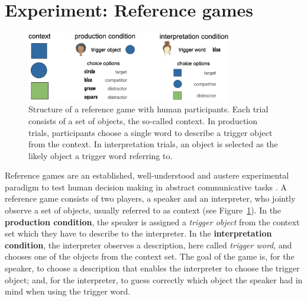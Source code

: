 \documentclass[fleqn]{article}
\begin{document}
\section{Experiment: Reference games}
\label{experiment-reference-games}

\begin{figure}
  \centering

  \includegraphics[width = 0.8\textwidth]{00-pics/reference-game.png}

  \caption{Structure of a reference game with human participants. Each trial consists of a set of objects, the so-called context. In production trials, participants choose a single word to describe a trigger object from the context. In interpretation trials, an object is selected as the likely object a trigger word referring to.}
  \label{fig:ref-game}
\end{figure}

Reference games are an established, well-understood and austere experimental paradigm to test human decision making in abstract communicative tasks \citep[e.g.,][]{FrankGoodman2012:Predicting-Prag,DegenFranke2013:Cost-Based-Prag,QingFranke2013:Variations-on-a,Frank2016:Rational-speech,SikosVenhuizen2021:Reevaluating-pr}.
A reference game consists of two players, a speaker and an interpreter, who jointly observe a set of objects, usually referred to as context (see Figure~\ref{fig:ref-game}).
In the \textbf{production condition}, the speaker is assigned a \emph{trigger object} from the context set which they have to describe to the interpreter.
In the \textbf{interpretation condition}, the interpreter observes a description, here called \emph{trigger word}, and chooses one of the objects from the context set.
The goal of the game is, for the speaker, to choose a description that enables the interpreter to choose the trigger object; and, for the interpreter, to guess correctly which object the speaker had in mind when using the trigger word.
\end{document}
